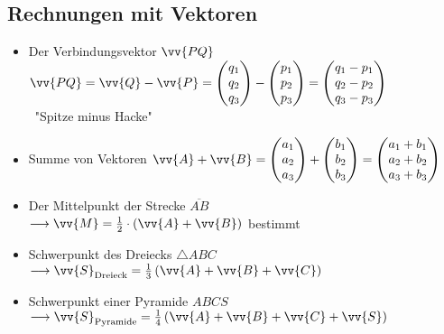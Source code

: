 \documentclass[a4paper,twocolumn,10pt]{onepgnote1}
\renewcommand\mynote{\notebox{Hinweis:}\ }  %
\begin{document}
\subsection{Rechnungen mit Vektoren}
\begin{itemize}
\item Der Verbindungsvektor $\vv{PQ}$ \\ $\vv{PQ} = \vv{Q} - \vv{P} = \begin{pmatrix} q_1 \\ q_2 \\ q_3 \end{pmatrix} - \begin{pmatrix} p_1 \\ p_2 \\ p_3 \end{pmatrix} = \begin{pmatrix} q_1 - p_1\\ q_2 - p_2\\ q_3 - p_3\end{pmatrix}$ \\ \mynote "Spitze minus Hacke"
\item Summe von Vektoren $\vv{A} +\vv{B} =  \begin{pmatrix} a_1 \\ a_2 \\ a_3 \end{pmatrix} + \begin{pmatrix} b_1 \\ b_2 \\ b_3 \end{pmatrix} = \begin{pmatrix} a_1 + b_1\\ a_2 + b_2\\ a_3 + b_3\end{pmatrix}$
\item Der Mittelpunkt der Strecke $\overline{AB}$  \\$ \longrightarrow \vv{M} = \frac{1}{2}\cdot \left(\vv{A} + \vv{B}\right)$ bestimmt 
\item Schwerpunkt des Dreiecks $\triangle ABC $\\ $\longrightarrow \vv{S}_{\text{Dreieck}} = \frac{1}{3} \left(\vv{A} + \vv{B} +\vv{C}\right)$
\item Schwerpunkt einer Pyramide $ABCS$ \\ $\longrightarrow \vv{S}_{\text{Pyramide}}= \frac{1}{4} \left(\vv{A} + \vv{B} +\vv{C} +\vv{S}\right)$
\end{itemize}
\end{document}
